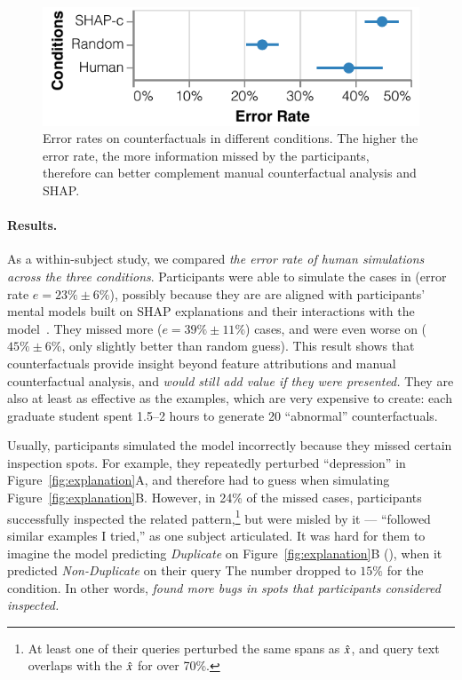 \begin{figure}[t]
\centering
\includegraphics[width=1\columnwidth]{figures/err_rate.pdf}
\vspace{-15pt}
\caption{
Error rates on counterfactuals in different conditions. The higher the error rate, the more information missed by the participants, therefore can better complement manual counterfactual analysis and SHAP.
}
\vspace{-10pt}
\label{fig:err_rate}
\end{figure}

\paragraph{Results.}
As a within-subject study, we compared \emph{the error rate of human simulations across the three conditions}.
Participants were able to simulate the cases in \crandom (error rate $e=23\%\pm6\%$), possibly because they are are aligned with participants' mental models built on SHAP explanations and their interactions with the model~\cite{miller}.
They missed more \chuman ($e=39\%\pm11\%$) cases, and were even worse on \cshap ($45\%\pm 6\%$, only slightly better than random guess).
This result shows that \cshap counterfactuals provide insight beyond feature attributions and manual counterfactual analysis, and \emph{would still add value if they were presented.}
They are also at least as effective as the \chuman examples, which are very expensive to create: each graduate student spent 1.5--2 hours to generate 20 ``abnormal'' counterfactuals.

Usually, participants simulated the model incorrectly because they missed certain inspection spots.
For example, they repeatedly perturbed ``depression'' in Figure~\ref{fig:explanation}A, and therefore had to guess when simulating Figure~\ref{fig:explanation}B.
However, in 24\% of the missed \cshap cases, participants successfully inspected the related pattern,\footnote{At least one of their queries perturbed the same spans as $\hat{x}$, and query text overlaps with the $\hat{x}$ for over 70\%.} but were misled by it --- ``followed similar examples I tried,'' as one subject articulated.
It was hard for them to imagine the model predicting \emph{Duplicate} on Figure~\ref{fig:explanation}B (), when it predicted \emph{Non-Duplicate} on their query 
The number dropped to $15\%$ for the \chuman condition.
In other words, \emph{\cshap found more bugs in spots that participants considered inspected.}


